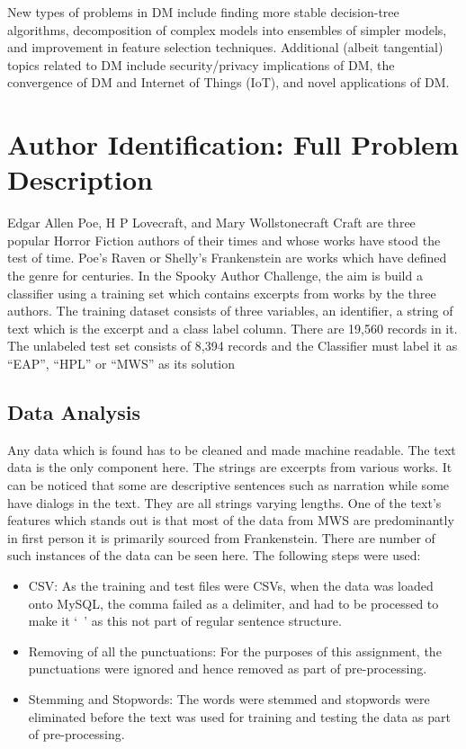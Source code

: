 \documentclass[fleqn,10pt]{SelfArx} %
\begin{document}
New types of problems in DM include finding more stable decision-tree algorithms, decomposition of complex models into ensembles of simpler models, and improvement in feature selection techniques. \cite{Wu:2007:TAD:1327434.1327436} Additional (albeit tangential) topics related to DM include security/privacy implications of DM, the convergence of DM and Internet of Things (IoT), and novel applications of DM.






%
%   
\section{Author Identification: Full Problem Description}
Edgar Allen Poe, H P Lovecraft, and Mary Wollstonecraft Craft are three popular Horror Fiction authors of their times and whose works have stood the test of time. Poe’s Raven or Shelly’s Frankenstein are works which have defined the genre for centuries. 
In the Spooky Author Challenge, the aim is build a classifier using a training set which contains excerpts from works by the three authors. The training dataset consists of three variables, an identifier, a string of text which is the excerpt and a class label column.  There are 19,560 records in it. The unlabeled test set consists of 8,394 records and the Classifier must label it as “EAP”, “HPL” or “MWS” as its solution

\subsection{Data Analysis}
Any data which is found has to be cleaned and made machine readable. The text data is the only component here. The strings are excerpts from various works. It can be noticed that some are descriptive sentences such as narration while some have dialogs in the text. They are all strings varying lengths. 
One of the text’s features which stands out is that most of the data from MWS are predominantly in first person it is primarily sourced from Frankenstein. 
There are number of such instances of the data can be seen here. The following steps were used:

\begin{itemize}[noitemsep]
\item CSV: As the training and test files were CSVs, when the data was loaded onto MySQL, the comma failed as a delimiter, and had to be processed to make it ‘~’ as this not part of regular sentence structure.
\item Removing of all the punctuations: For the purposes of this assignment, the punctuations were ignored and hence removed as part of pre-processing.
\item Stemming and Stopwords: The words were stemmed and stopwords were eliminated before the text was used for training and testing the data as part of pre-processing. 
\end{itemize}
\end{document}
